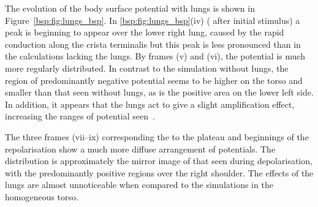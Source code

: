 The evolution of the body surface potential with lungs is shown in
Figure~\ref{bsp:fig:lungs_bsp}.
In \ref{bsp:fig:lungs_bsp}(iv) ( after initial stimulus) a peak is
beginning to appear over the lower right lung, caused by the rapid conduction
along the crista terminalis but this peak is less pronounced than in the
calculations lacking the lungs.
By frames (v) and (vi), the potential is much more regularly distributed.
In contrast to the simulation without lungs, the region of predominantly
negative potential seems to be higher on the torso and smaller than that seen
without lungs, as is the positive area on the lower left side.
In addition, it appears that the lungs act to give a slight amplification
effect, increasing the ranges of potential seen~\cite{Gulrajani1983}.

The three frames (vii--ix) corresponding the to the plateau and beginnings of the
repolarisation show a much more diffuse arrangement of potentials.
The distribution is approximately the mirror image of that seen during
depolarisation, with the predominantly positive regions over the right shoulder.
The effects of the lungs are almost unnoticeable when compared to the
simulations in the homogeneous torso.

